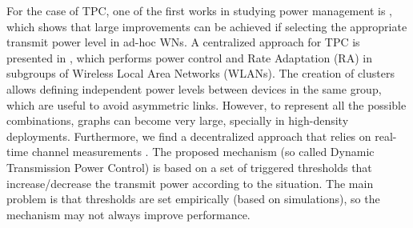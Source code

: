 \documentclass[preprint,12pt]{elsarticle}
\begin{document}
For the case of TPC, one of the first works in studying power management is \cite{elbatt2000power}, which shows that large improvements can be achieved if selecting the appropriate transmit power level in ad-hoc WNs. A centralized approach for TPC is presented in \cite{tang2014joint}, which performs power control and Rate Adaptation (RA) in subgroups of Wireless Local Area Networks (WLANs). The creation of clusters allows defining independent power levels between devices in the same group, which are useful to avoid asymmetric links. However, to represent all the possible combinations, graphs can become very large, specially in high-density deployments. Furthermore, we find a decentralized approach that relies on real-time channel measurements \cite{gandarillas2014dynamic}. The proposed mechanism (so called Dynamic Transmission Power Control) is based on a set of triggered thresholds that increase/decrease the transmit power according to the situation. The main problem is that thresholds are set empirically (based on simulations), so the mechanism may not always improve performance.

\end{document}
